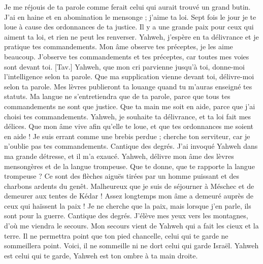 \begin{multicols}{2}
Je me réjouis de ta parole comme ferait celui qui aurait trouvé un grand butin.
J'ai en haine et en abomination le mensonge ; j'aime ta loi.
Sept fois le jour je te loue à cause des ordonnances de ta justice.
Il y a une grande paix pour ceux qui aiment ta loi, et rien ne peut les renverser.
Yahweh, j'espère en ta délivrance et je pratique tes commandements.
Mon âme observe tes préceptes, je les aime beaucoup.
J'observe tes commandements et tes préceptes, car toutes mes voies sont devant toi.
[Tav.] Yahweh, que mon cri parvienne jusqu'à toi, donne-moi l'intelligence selon ta parole.
Que ma supplication vienne devant toi, délivre-moi selon ta parole.
Mes lèvres publieront ta louange quand tu m'auras enseigné tes statuts.
Ma langue ne s'entretiendra que de ta parole, parce que tous tes commandements ne sont que justice.
Que ta main me soit en aide, parce que j'ai choisi tes commandements.
Yahweh, je souhaite ta délivrance, et ta loi fait mes délices.
Que mon âme vive afin qu'elle te loue, et que tes ordonnances me soient en aide !
Je suis errant comme une brebis perdue ; cherche ton serviteur, car je n'oublie pas tes commandements.
\VerseOne{}Cantique des degrés. J'ai invoqué Yahweh dans ma grande détresse, et il m'a exaucé.
Yahweh, délivre mon âme des lèvres mensongères et de la langue trompeuse.
Que te donne, que te rapporte la langue trompeuse ?
Ce sont des flèches aiguës tirées par un homme puissant et des charbons ardents du genêt.
Malheureux que je suis de séjourner à Méschec et de demeurer aux tentes de Kédar !
Assez longtemps mon âme a demeuré auprès de ceux qui haïssent la paix !
Je ne cherche que la paix, mais lorsque j'en parle, ils sont pour la guerre.
\VerseOne{}Cantique des degrés. J'élève mes yeux vers les montagnes, d'où me viendra le secours.
Mon secours vient de Yahweh qui a fait les cieux et la terre.
Il ne permettra point que ton pied chancelle, celui qui te garde ne sommeillera point.
Voici, il ne sommeille ni ne dort celui qui garde Israël.
Yahweh est celui qui te garde, Yahweh est ton ombre à ta main droite.

\end{multicols}

